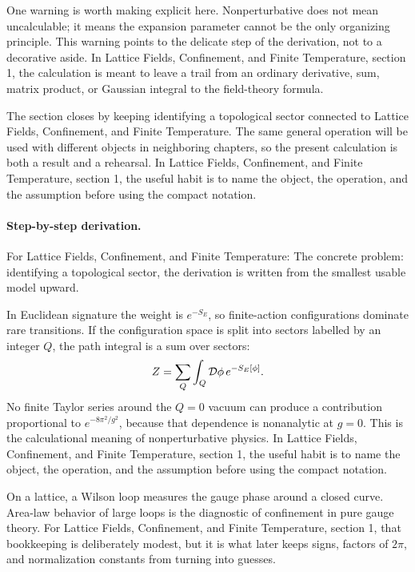 One warning is worth making explicit here.  Nonperturbative does not mean uncalculable; it means the expansion parameter cannot be the only organizing principle.  This warning points to the delicate step of the derivation, not to a decorative aside.  In Lattice Fields, Confinement, and Finite Temperature, section 1, the calculation is meant to leave a trail from an ordinary derivative, sum, matrix product, or Gaussian integral to the field-theory formula.

The section closes by keeping identifying a topological sector connected to Lattice Fields, Confinement, and Finite Temperature.  The same general operation will be used with different objects in neighboring chapters, so the present calculation is both a result and a rehearsal.  In Lattice Fields, Confinement, and Finite Temperature, section 1, the useful habit is to name the object, the operation, and the assumption before using the compact notation.



\paragraph{Step-by-step derivation.}

For Lattice Fields, Confinement, and Finite Temperature: The concrete problem: identifying a topological sector, the derivation is written from the smallest usable model upward.

In Euclidean signature the weight is \(e^{-S_E}\), so finite-action configurations dominate rare transitions.  If the configuration space is split into sectors labelled by an integer \(Q\), the path integral is a sum over sectors:
\[
  Z=\sum_Q\int_Q\mathcal D\phi\,e^{-S_E[\phi]}.
\]
No finite Taylor series around the \(Q=0\) vacuum can produce a contribution proportional to \(e^{-8\pi^2/g^2}\), because that dependence is nonanalytic at \(g=0\).  This is the calculational meaning of nonperturbative physics.  In Lattice Fields, Confinement, and Finite Temperature, section 1, the useful habit is to name the object, the operation, and the assumption before using the compact notation.

On a lattice, a Wilson loop measures the gauge phase around a closed curve.  Area-law behavior of large loops is the diagnostic of confinement in pure gauge theory.  For Lattice Fields, Confinement, and Finite Temperature, section 1, that bookkeeping is deliberately modest, but it is what later keeps signs, factors of \(2\pi\), and normalization constants from turning into guesses.

